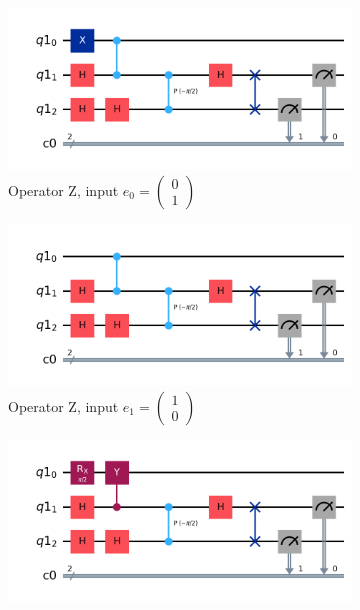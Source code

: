 \documentclass[12pt]{extarticle}
\begin{document}
\begin{figure}[htbp]
    \centering
    \captionsetup[subfigure]{labelformat=empty}
    \begin{subfigure}[b]{0.45\textwidth}
        \centering
        \includegraphics[width=\textwidth]{images/homework3_q2_qpe_z_e0.png}
        \caption{Operator Z, input $e_0=\begin{pmatrix} 0 \\ 1 \end{pmatrix}$}
    \end{subfigure}
    \hfill
    \begin{subfigure}[b]{0.45\textwidth}
        \centering
        \includegraphics[width=\textwidth]{images/homework3_q2_qpe_z_e1.png}
        \caption{Operator Z, input $e_1=\begin{pmatrix} 1 \\ 0 \end{pmatrix}$}
    \end{subfigure}
    \vfill
    \begin{subfigure}[b]{0.45\textwidth}
        \centering
        \includegraphics[width=\textwidth]{images/homework3_q2_qpe_y_e0.png}

\end{subfigure}
\end{figure}
\end{document}
